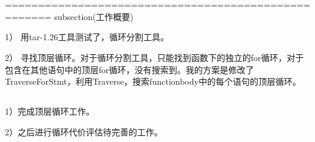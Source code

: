 \section{}

=====================================================
subsection{\hei(工作概要)}
\usepackage{\color{red} 文本}

1） 用tar-1.26工具测试了，循环分割工具。

2） 寻找顶层循环。对于循环分割工具，只能找到函数下的独立的for循环，对于包含在其他语句中的顶层for循环，没有搜索到。我的方案是修改了TraverseForStmt，利用Traverse，搜索functionbody中的每个语句的顶层循环。

\subsection{}

1）完成顶层循环工作。

2）之后进行循环代价评估待完善的工作。
